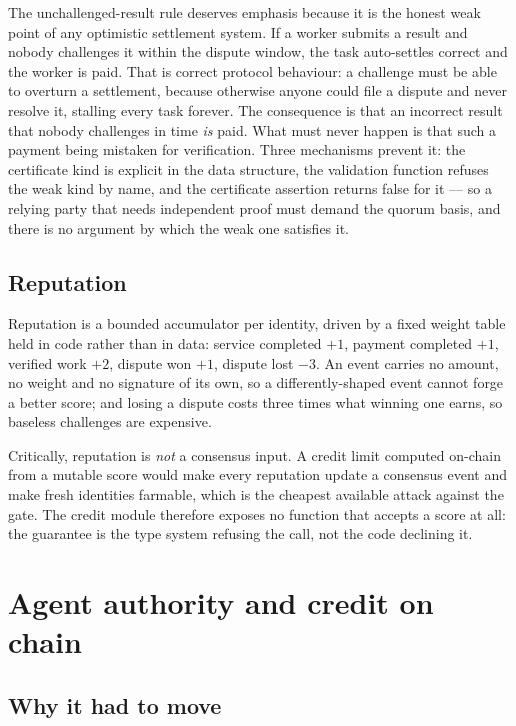 \documentclass{article}
\begin{document}
The unchallenged-result rule deserves emphasis because it is the honest weak
point of any optimistic settlement system. If a worker submits a result and
nobody challenges it within the dispute window, the task auto-settles correct
and the worker is paid. That is correct protocol behaviour: a challenge must be
able to overturn a settlement, because otherwise anyone could file a dispute
and never resolve it, stalling every task forever. The consequence is that an
incorrect result that nobody challenges in time \emph{is} paid. What must never
happen is that such a payment being mistaken for verification. Three
mechanisms prevent it: the certificate kind is explicit in the data structure,
the validation function refuses the weak kind by name, and the certificate
assertion returns false for it --- so a relying party that needs independent
proof must demand the quorum basis, and there is no argument by which the weak
one satisfies it.

\subsection{Reputation}

Reputation is a bounded accumulator per identity, driven by a fixed weight
table held in code rather than in data: service completed $+1$, payment
completed $+1$, verified work $+2$, dispute won $+1$, dispute lost $-3$. An
event carries no amount, no weight and no signature of its own, so a
differently-shaped event cannot forge a better score; and losing a dispute
costs three times what winning one earns, so baseless challenges are
expensive.

Critically, reputation is \emph{not} a consensus input. A credit limit computed
on-chain from a mutable score would make every reputation update a consensus
event and make fresh identities farmable, which is the cheapest available
attack against the gate. The credit module therefore exposes no function that
accepts a score at all: the guarantee is the type system refusing the call,
not the code declining it.


\section{Agent authority and credit on chain}
\label{sec:authority}

\subsection{Why it had to move}
\end{document}
